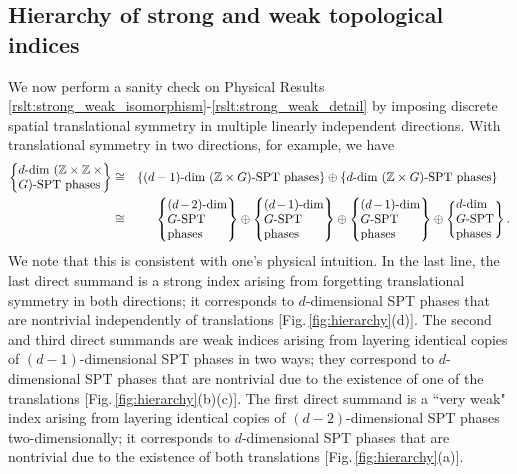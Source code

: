 \documentclass[sort&compress]{elsarticle}
\theoremstyle{theoremstyle}
\theoremstyle{framedtheoremstyle}
\theoremstyle{definitionstyle}
\theoremstyle{definitionstyle}
\theoremstyle{definitionstyle}
\theoremstyle{definitionstyle}
\theoremstyle{nameddefinitionstyle}
\theoremstyle{framednameddefinitionstyle}
\theoremstyle{proofstyle}
\theoremstyle{definitionstyle}
\newcommand{\ZZZ}{\mathbb{Z}}
\newcommand{\isomorphic}{\cong}
\newcommand{\paren}[1]{\left( #1 \right)}
\newcommand{\braces}[1]{\left\{ #1 \right\}}
\begin{document}
\subsection{Hierarchy of strong and weak topological indices\label{subsec:hierarchy_strong_weak_topological_indices}}

We now perform a sanity check on Physical Results \ref{rslt:strong_weak_isomorphism}-\ref{rslt:strong_weak_detail} by imposing discrete spatial translational symmetry in multiple linearly independent directions. With translational symmetry in two directions, for example, we have
\begin{eqnarray}
\braces{\parbox{2.4cm}{$d$-dim $(\ZZZ \times \ZZZ \times G)$-SPT phases}}
&\isomorphic&
\braces{\mbox{$(d-1)$-dim $\paren{\ZZZ \times G}$-SPT phases}}
\oplus
\braces{\mbox{$d$-dim $\paren{\ZZZ \times G}$-SPT phases}}~~~ \nonumber\\
&\isomorphic&
\braces{\parbox{1.7cm}{$(d-2)$-dim $G$-SPT phases}} 
\oplus
\braces{\parbox{1.7cm}{$(d-1)$-dim $G$-SPT phases}}
\oplus
\braces{\parbox{1.7cm}{$(d-1)$-dim $G$-SPT phases}} 
\oplus
\braces{\parbox{1.1cm}{$d$-dim $G$-SPT phases}}.
\end{eqnarray}
We note that this is consistent with one's physical intuition. In the last line, the last direct summand is a strong index arising from forgetting translational symmetry in both directions; it corresponds to $d$-dimensional SPT phases that are nontrivial independently of translations [Fig.\,\ref{fig:hierarchy}(d)]. The second and third direct summands are weak indices arising from layering identical copies of $(d-1)$-dimensional SPT phases in two ways; they correspond to $d$-dimensional SPT phases that are nontrivial due to the existence of one of the translations [Fig.\,\ref{fig:hierarchy}(b)(c)]. The first direct summand is a ``very weak" index arising from layering identical copies of $(d-2)$-dimensional SPT phases two-dimensionally; it corresponds to $d$-dimensional SPT phases that are nontrivial due to the existence of both translations [Fig.\,\ref{fig:hierarchy}(a)].

\end{document}

